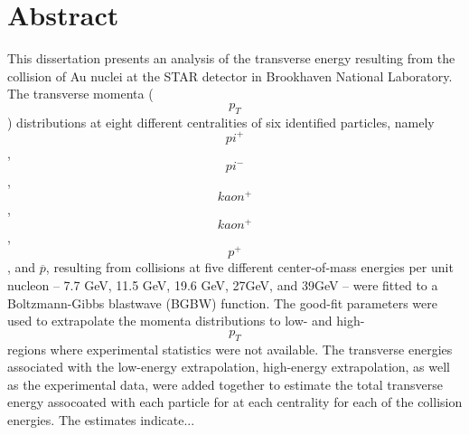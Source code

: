 \chapter*{Abstract}\label{ch:abstract}

This dissertation presents an analysis of the transverse energy resulting from the collision of Au nuclei at the STAR detector in Brookhaven National Laboratory. The transverse momenta (\[p_T\]) distributions at eight different centralities of six identified particles, namely \[pi^+\], \[pi^-\], \[kaon^+\], \[kaon^+\], \[p^+\], and $\overbar{p}$, resulting from collisions at five different center-of-mass energies per unit nucleon -- 7.7 GeV, 11.5 GeV, 19.6 GeV, 27GeV, and 39GeV -- were fitted to a Boltzmann-Gibbs blastwave (BGBW) function. The good-fit parameters were used to extrapolate the momenta distributions to low- and high-\[p_T\] regions where experimental statistics were not available. The transverse energies associated with the low-energy extrapolation, high-energy extrapolation, as well as the experimental data, were added together to estimate the total transverse energy assocoated with each particle for at each centrality for each of the collision energies. The estimates indicate...

